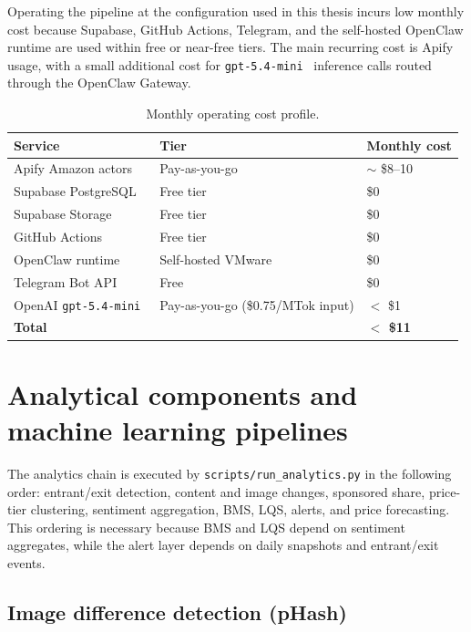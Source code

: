 Operating the pipeline at the configuration used in this thesis incurs
low monthly cost because Supabase, GitHub Actions, Telegram, and the
self-hosted OpenClaw runtime are used within free or near-free tiers.
The main recurring cost is Apify usage, with a small additional cost for
\texttt{gpt-5.4-mini}~\citep{openai2026gpt54mini} inference calls routed
through the OpenClaw Gateway.

\begin{table}[H]
  \centering
  \small
  \begin{tabular}{lll}
    \toprule
    \textbf{Service} & \textbf{Tier} & \textbf{Monthly cost} \\
    \midrule
    Apify Amazon actors & Pay-as-you-go & $\sim$ \$8--10 \\
    Supabase PostgreSQL & Free tier & \$0 \\
    Supabase Storage & Free tier & \$0 \\
    GitHub Actions & Free tier & \$0 \\
    OpenClaw runtime & Self-hosted VMware & \$0 \\
    Telegram Bot API & Free & \$0 \\
    OpenAI \texttt{gpt-5.4-mini}~\citep{openai2026gpt54mini} & Pay-as-you-go (\$0.75/MTok input) & $<$ \$1 \\
    \midrule
    \textbf{Total} & & \textbf{$<$ \$11} \\
    \bottomrule
  \end{tabular}
  \caption{Monthly operating cost profile.}
  \label{tab:costs}
\end{table}

\section{Analytical components and machine learning pipelines}

The analytics chain is executed by \texttt{scripts/run\_analytics.py} in
the following order: entrant/exit detection, content and image changes,
sponsored share, price-tier clustering, sentiment aggregation, BMS, LQS,
alerts, and price forecasting. This ordering is necessary because BMS
and LQS depend on sentiment aggregates, while the alert layer depends on
daily snapshots and entrant/exit events.

\subsection{Image difference detection (pHash)}

